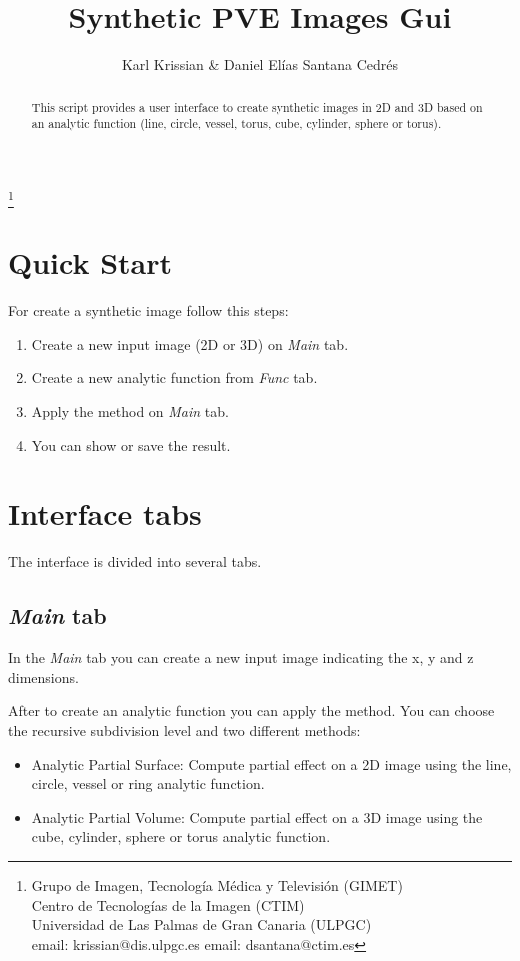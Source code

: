 \documentclass{article}
\begin{document}
\title{Synthetic PVE Images Gui}
\author{Karl Krissian \& Daniel El\'ias Santana Cedr\'es}
\thanks{
Grupo de Imagen, Tecnolog\'ia M\'edica y Televisi\'on (GIMET)\\
Centro de Tecnolog\'ias de la Imagen (CTIM)\\
Universidad de Las Palmas de Gran Canaria (ULPGC)\\
email: krissian@dis.ulpgc.es
email: dsantana@ctim.es
}


\maketitle

\begin{abstract}
This script provides a user interface to create synthetic images in 2D and 3D based on an analytic function (line, circle, vessel, torus, cube, cylinder, sphere or torus).
\end{abstract}


\section{Quick Start}

For create a synthetic image follow this steps:
\begin{enumerate}
  \item Create a new input image (2D or 3D) on \emph{Main} tab.
  \item Create a new analytic function from \emph{Func} tab.
  \item Apply the method on \emph{Main} tab.
  \item You can show or save the result.
\end{enumerate}

\section{Interface tabs}

The interface is divided into several tabs.

\subsection{\emph{Main} tab}
In the \emph{Main} tab you can create a new input image indicating the x, y and z dimensions.

After to create an analytic function you can apply the method. You can choose the recursive subdivision level and two different methods:
\begin{itemize}
	\item Analytic Partial Surface: Compute partial effect on a 2D image using the line, circle, vessel or ring analytic function.
	\item Analytic Partial Volume: Compute partial effect on a 3D image using the cube, cylinder, sphere or torus analytic function.
\end{itemize}
\end{document}

